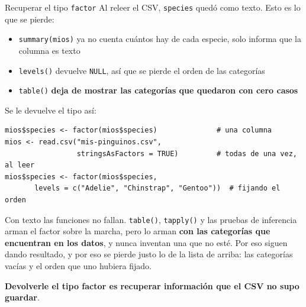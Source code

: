 \documentclass[aspectratio=169,10pt]{beamer}
\newcommand{\Rc}[1]{{\setlength{\fboxsep}{1.6pt}%
  \colorbox{codigoFondo}{\textcolor{codigoTexto}{\texttt{#1}}}}}
\newcommand{\destaca}[1]{%
  \par\vspace{3pt}\noindent
  \colorbox{azulClaro}{%
    \parbox{\dimexpr\linewidth-2\fboxsep\relax}{\vspace{3pt}#1\vspace{3pt}}}%
  \par\vspace{3pt}}
\begin{document}
\begin{frame}[fragile]{Recuperar el tipo \texttt{factor}}
  Al releer el CSV, \texttt{species} quedó como texto. Esto es lo que se pierde:

  \vspace{0.15cm}
  \begin{itemize}
    \item \Rc{summary(mios)} ya no cuenta cuántos hay de cada especie, solo informa
      que la columna es texto
    \item \Rc{levels()} devuelve \Rc{NULL}, así que se pierde el orden de las categorías
    \item \Rc{table()} \textbf{deja de mostrar las categorías que quedaron con cero casos}
  \end{itemize}

  \vspace{0.15cm}
  Se le devuelve el tipo así:
\begin{lstlisting}
mios$species <- factor(mios$species)              # una columna
mios <- read.csv("mis-pinguinos.csv",
                 stringsAsFactors = TRUE)         # todas de una vez, al leer
mios$species <- factor(mios$species,
       levels = c("Adelie", "Chinstrap", "Gentoo"))  # fijando el orden
\end{lstlisting}

  \vspace{0.2cm}
  \destaca{\small Con texto las funciones no fallan. \Rc{table()}, \Rc{tapply()} y las
  pruebas de inferencia arman el factor sobre la marcha, pero lo arman \textbf{con las
  categorías que encuentran en los datos}, y nunca inventan una que no esté. Por eso
  siguen dando resultado, y por eso se pierde justo lo de la lista de arriba: las
  categorías vacías y el orden que uno hubiera fijado.

  \vspace{0.15cm}
  \textbf{Devolverle el tipo factor es recuperar información que el CSV no supo
  guardar}.}
\end{frame}
\end{document}
